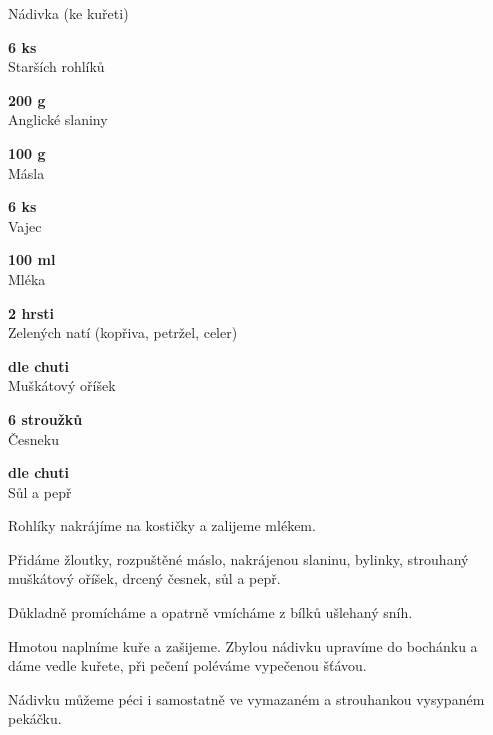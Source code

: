 \documentclass[11pt,a4paper]{article}
\begin{document}
\begin{recipe}[Coral]{Nádivka (ke kuřeti)}
    \begin{ingredients}
        \item \parbox[t]{\linewidth}{\raggedright \piece \textbf{6 ks}\\ Starších rohlíků}
        \item \parbox[t]{\linewidth}{\raggedright \weight \textbf{200 g}\\ Anglické slaniny}
        \item \parbox[t]{\linewidth}{\raggedright \weight \textbf{100 g}\\ Másla}
        \item \parbox[t]{\linewidth}{\raggedright \piece \textbf{6 ks}\\ Vajec}
        \item \parbox[t]{\linewidth}{\raggedright \liquid \textbf{100 ml}\\ Mléka}
        \item \parbox[t]{\linewidth}{\raggedright \indefinite \textbf{2 hrsti}\\ Zelených natí (kopřiva, petržel, celer)}
        \item \parbox[t]{\linewidth}{\raggedright \indefinite \textbf{dle chuti}\\ Muškátový oříšek}
        \item \parbox[t]{\linewidth}{\raggedright \piece \textbf{6 stroužků}\\ Česneku}
        \item \parbox[t]{\linewidth}{\raggedright \indefinite \textbf{dle chuti}\\ Sůl a pepř}
    \end{ingredients}
    \begin{steps}
        \item Rohlíky nakrájíme na kostičky a zalijeme mlékem.
        \item Přidáme žloutky, rozpuštěné máslo, nakrájenou slaninu, bylinky, strouhaný muškátový oříšek, drcený česnek, sůl a pepř.
        \item Důkladně promícháme a opatrně vmícháme z bílků ušlehaný sníh.
        \item Hmotou naplníme kuře a zašijeme. Zbylou nádivku upravíme do bochánku a dáme vedle kuřete, při pečení poléváme vypečenou šťávou.
        \item Nádivku můžeme péci i samostatně ve vymazaném a strouhankou vysypaném pekáčku.
    \end{steps}
\end{recipe}
\end{document}
